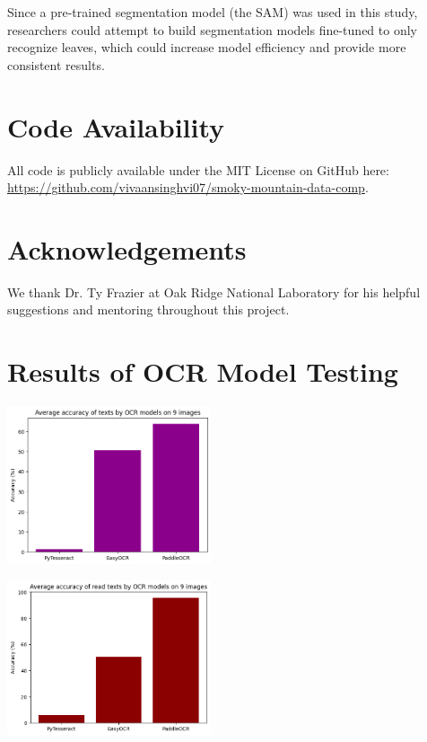\documentclass[final,5p,times,twocolumn,authoryear]{elsarticle}
\begin{document}
Since a pre-trained segmentation model (the SAM) was used in this study, researchers could attempt to build segmentation models fine-tuned to only recognize leaves, which could increase model efficiency and provide more consistent results.

\section{Code Availability}
\label{code}

All code is publicly available under the MIT License on GitHub here: \url{https://github.com/vivaansinghvi07/smoky-mountain-data-comp}.

\section*{Acknowledgements}
\label{acknowledgements}

We thank Dr. Ty Frazier at Oak Ridge National Laboratory for his helpful suggestions and mentoring throughout this project.




\clearpage
\appendix

\section{Results of OCR Model Testing}
\label{app_ocr_testing}

\begin{center}
	\includegraphics[width=0.45\textwidth]{images/ocr_average_accuracy.png}	
\end{center}

\begin{center}
	\includegraphics[width=0.45\textwidth]{images/pruned_ocr_average_accuracy.png}	
\end{center}
\end{document}
